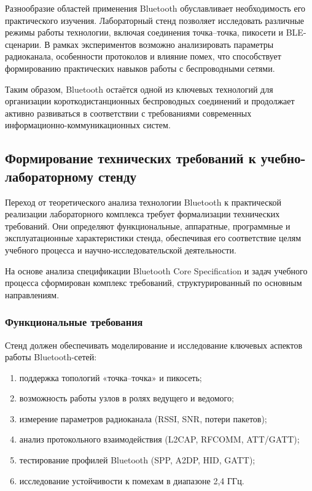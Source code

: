 Разнообразие областей применения Bluetooth обуславливает необходимость его практического изучения. Лабораторный стенд позволяет исследовать различные режимы работы технологии, включая соединения точка--точка, пикосети и BLE-сценарии. В рамках экспериментов возможно анализировать параметры радиоканала, особенности протоколов и влияние помех, что способствует формированию практических навыков работы с беспроводными сетями.

Таким образом, Bluetooth остаётся одной из ключевых технологий для организации короткодистанционных беспроводных соединений и продолжает активно развиваться в соответствии с требованиями современных информационно-коммуникационных систем.

\subsection{Формирование технических требований к учебно-лабораторному стенду}

Переход от теоретического анализа технологии Bluetooth к практической реализации лабораторного комплекса требует формализации технических требований. Они определяют функциональные, аппаратные, программные и эксплуатационные характеристики стенда, обеспечивая его соответствие целям учебного процесса и научно-исследовательской деятельности.

На основе анализа спецификации Bluetooth Core Specification и задач учебного процесса сформирован комплекс требований, структурированный по основным направлениям.

\subsubsection{Функциональные требования}

Стенд должен обеспечивать моделирование и исследование ключевых аспектов работы Bluetooth-сетей:
\begin{enumerate}[nosep]
    \item поддержка топологий «точка--точка» и пикосеть;
    \item возможность работы узлов в ролях ведущего и ведомого;
    \item измерение параметров радиоканала (RSSI, SNR, потери пакетов);
    \item анализ протокольного взаимодействия (L2CAP, RFCOMM, ATT/GATT);
    \item тестирование профилей Bluetooth (SPP, A2DP, HID, GATT);
    \item исследование устойчивости к помехам в диапазоне 2{,}4 ГГц.
\end{enumerate}

